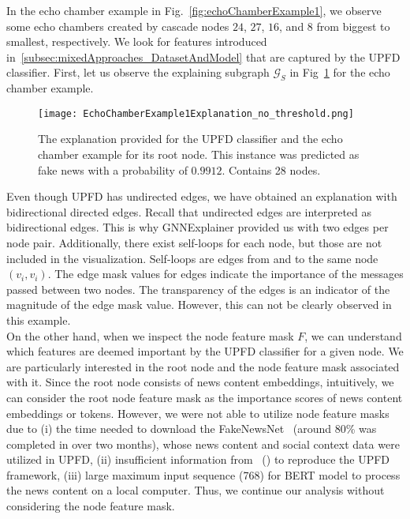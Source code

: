 In the echo chamber example in Fig.~\ref{fig:echoChamberExample1}, we observe some echo chambers created by cascade nodes $24$, $27$, $16$, and $8$ from biggest to smallest, respectively. We look for features introduced in~\ref{subsec:mixedApproaches_DatasetAndModel} that are captured by the UPFD classifier. First, let us observe the explaining subgraph $\mathcal{G}_S$ in Fig~\ref{fig:EchoChamberExample1Explanation_no_threshold} for the echo chamber example.\\
\begin{figure}
    \centering
    \texttt{[image: EchoChamberExample1Explanation\_no\_threshold.png]}
    \caption[Echo chamber example explanation for root node.]{The explanation provided for the UPFD classifier and the echo chamber example for its root node. This instance was predicted as fake news with a probability of $0.9912$. Contains 28 nodes.}
    \label{fig:EchoChamberExample1Explanation_no_threshold}
\end{figure}
Even though UPFD has undirected edges, we have obtained an explanation with bidirectional directed edges. Recall that undirected edges are interpreted as bidirectional edges. This is why GNNExplainer provided us with two edges per node pair. Additionally, there exist self-loops for each node, but those are not included in the visualization. Self-loops are edges from and to the same node $(v_i, v_i)$. The edge mask values for edges indicate the importance of the messages passed between two nodes. The transparency of the edges is an indicator of the magnitude of the edge mask value. However, this can not be clearly observed in this example.\\
On the other hand, when we inspect the node feature mask $F$, we can understand which features are deemed important by the UPFD classifier for a given node. We are particularly interested in the root node and the node feature mask associated with it. Since the root node consists of news content embeddings, intuitively, we can consider the root node feature mask as the importance scores of news content embeddings or tokens. However, we were not able to utilize node feature masks due to (i) the time needed to download the FakeNewsNet~\parencite{FakeNewsNet_Shu} (around 80\% was completed in over two months), whose news content and social context data were utilized in UPFD, (ii) insufficient information from~\citeauthor{UPFD_Dataset_Shu} (\citeyear{UPFD_Dataset_Shu}) to reproduce the UPFD framework, (iii) large maximum input sequence (768) for BERT model to process the news content on a local computer. Thus, we continue our analysis without considering the node feature mask. \\
